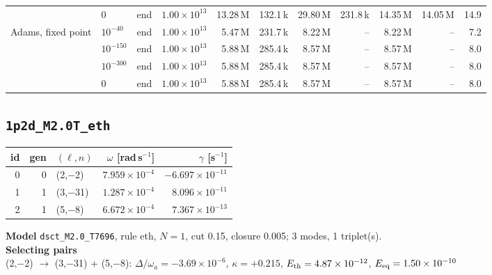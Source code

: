 {\begin{tabular}{@{}llllrrrrrrr@{}}
 & $0$ & end & $1.00\times10^{13}$ & 13.28\,M & 132.1\,k & 29.80\,M & 231.8\,k & 14.35\,M & 14.05\,M & 14.9 \\
\addlinespace[2pt]
Adams, fixed point & $10^{-40}$ & end & $1.00\times10^{13}$ & 5.47\,M & 231.7\,k & 8.22\,M & -- & 8.22\,M & -- & 7.2 \\
 & $10^{-150}$ & end & $1.00\times10^{13}$ & 5.88\,M & 285.4\,k & 8.57\,M & -- & 8.57\,M & -- & 8.0 \\
 & $10^{-300}$ & end & $1.00\times10^{13}$ & 5.88\,M & 285.4\,k & 8.57\,M & -- & 8.57\,M & -- & 8.0 \\
 & $0$ & end & $1.00\times10^{13}$ & 5.88\,M & 285.4\,k & 8.57\,M & -- & 8.57\,M & -- & 8.0 \\
\bottomrule
\end{tabular}}

\clearpage
\subsection{\texttt{1p2d\_M2.0T\_eth}}\label{net:1p2d_M2.0T_eth}
\noindent\begin{minipage}[t]{0.43\textwidth}\vspace{0pt}\footnotesize
\begin{tabular}{@{}rrlrr@{}}
\toprule
id & gen & $(\ell,n)$ & $\omega$ [rad\,s$^{-1}$] & $\gamma$ [s$^{-1}$] \\
\midrule
0 & 0 & (2,$-$2) & $7.959\times10^{-4}$ & $-6.697\times10^{-11}$ \\
1 & 1 & (3,$-$31) & $1.287\times10^{-4}$ & $8.096\times10^{-11}$ \\
2 & 1 & (5,$-$8) & $6.672\times10^{-4}$ & $7.367\times10^{-13}$ \\
\bottomrule
\end{tabular}
\end{minipage}\hfill
\begin{minipage}[t]{0.55\textwidth}\vspace{0pt}\footnotesize
\textbf{Model} \texttt{dsct\_M2.0\_T7696}, rule eth, $N=1$, cut 0.15,
closure 0.005; 3 modes, 1 triplet(s).\\[2pt]
\textbf{Selecting pairs}\\ (2,$-$2) $\to$ (3,$-$31) + (5,$-$8): $\Delta/\omega_a=-3.69\times10^{-6}$, $\kappa=+0.215$, $E_{\rm th}=4.87\times10^{-12}$, $E_{\rm eq}=1.50\times10^{-10}$\\[2pt]

\end{minipage}

